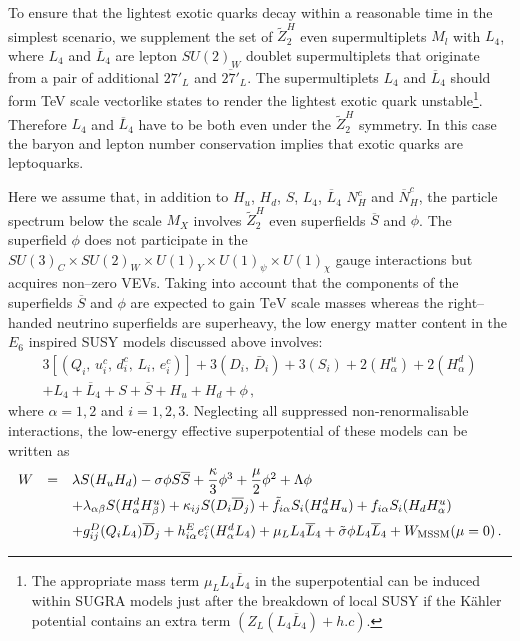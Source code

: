 \documentclass[12pt,a4paper]{article}
\newcommand{\be}{\begin{equation}}
\newcommand{\ee}{\end{equation}}
\newcommand{\ba}{\begin{array}}
\newcommand{\ea}{\end{array}}
\begin{document}
To ensure that the lightest exotic quarks decay within a reasonable time in the 
simplest scenario, we supplement
the set of $\tilde{Z}^{H}_2$ even supermultiplets $M_{l}$ with $L_4$, where $L_4$ and
$\overline{L}_4$ are lepton $SU(2)_W$ doublet supermultiplets that originate from a pair of additional
$27'_{L}$ and $\overline{27'}_L$. The supermultiplets $L_4$ and $\overline{L}_4$ should form TeV scale
vectorlike states to render the lightest exotic quark unstable\footnote{The appropriate mass term
$\mu_L L_4\overline{L}_4$ in the superpotential can be induced within SUGRA models just after the
breakdown of local SUSY if the K\"ahler potential contains an extra term $(Z_L (L_4\overline{L}_4)+h.c)$\cite{45}.}.
Therefore $L_4$ and $\overline{L}_4$ have to be both even under the $\tilde{Z}^{H}_2$ symmetry.
In this case the baryon and lepton number conservation implies that exotic quarks are leptoquarks.

Here we assume that, in addition to $H_u$, $H_d$, $S$, $L_4$,
$\overline{L}_4$ $N^c_H$ and $\overline{N}_H^c$, the particle spectrum
below the scale $M_X$ involves $\tilde{Z}^{H}_2$ even superfields
$\overline{S}$ and $\phi$. The superfield $\phi$ does not
participate in the $SU(3)_C\times SU(2)_W\times U(1)_Y\times
U(1)_{\psi}\times U(1)_{\chi}$ gauge interactions but acquires
non--zero VEVs. Taking into account that the components of the
superfields $\overline{S}$ and $\phi$ are expected to gain
$\mbox{TeV}$ scale masses whereas the right--handed neutrino
superfields are superheavy, the low energy matter content in the $E_6$
inspired SUSY models discussed above involves: \be \ba{c}
3\left[(Q_i,\,u^c_i,\,d^c_i,\,L_i,\,e^c_i)\right]
+3(D_i,\,\bar{D}_i)+3(S_{i})+2(H^u_{\alpha})+2(H^d_{\alpha})\\[2mm]
+L_4+\overline{L}_4+S+\overline{S}+H_u+H_d+\phi\,, \ea
\label{hd7}
\ee
where $\alpha=1,2$ and $i=1,2,3$. Neglecting all suppressed non-renormalisable interactions,
the low-energy effective superpotential of these models can be written as
\be
\ba{rcl}
W &=& \lambda S (H_u H_d) - \sigma \phi S \overline{S} + \dfrac{\kappa}{3}\phi^3+\dfrac{\mu}{2}\phi^2+\Lambda\phi\\[2mm]
&&+ \lambda_{\alpha\beta} S (H^d_{\alpha} H^u_{\beta})+ \kappa_{ij} S (D_{i} \overline{D}_{j}) + \tilde{f}_{i\alpha} S_{i} (H^d_{\alpha} H_u)
+ f_{i\alpha} S_{i} (H_d H^u_{\alpha}) \\[2mm]
&&+ g^D_{ij} (Q_i L_4) \overline{D}_j+ h^E_{i\alpha} e^c_{i} (H^d_{\alpha} L_4) + \mu_L L_4\overline{L}_4+
\tilde{\sigma} \phi L_4\overline{L}_4+ W_{\rm MSSM}(\mu=0)\,.
\ea
\label{hd8}
\ee
\end{document}
